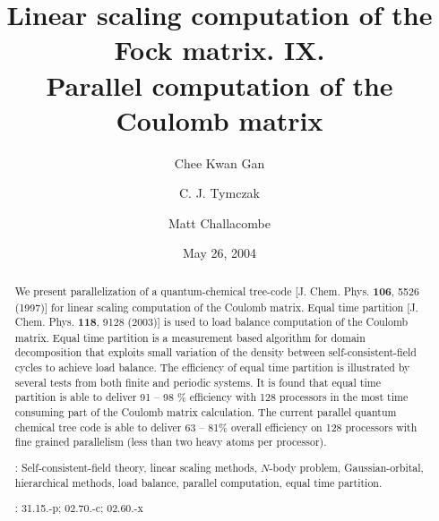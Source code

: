 \commentoutA{\documentclass[prl,aps,twocolumn,twocolumngrid,superbib]{revtex4}}
\begin{document}
\title[Short Title]{
Linear scaling computation of the Fock matrix. IX. \\
Parallel computation of the Coulomb matrix\footnotemark[1]}

\author{Chee Kwan Gan\footnotemark[2]}
\author{C. J. Tymczak}
\author{Matt Challacombe}


\date{May 26, 2004}

\begin{abstract}
We present parallelization of a quantum-chemical tree-code
[J. Chem. Phys. {\bf 106}, 5526 (1997)] for linear scaling computation
of the Coulomb matrix.  Equal time partition [J. Chem. Phys. {\bf
118}, 9128 (2003)] is used to load balance computation of the Coulomb
matrix. Equal time partition is a measurement based algorithm for
domain decomposition that exploits small variation of the density
between self-consistent-field cycles to achieve load balance. The
efficiency of equal time partition is illustrated by several tests
from both finite and periodic systems.  It is found that equal time
partition is able to deliver 91 -- 98 \% efficiency with 128
processors in the most time consuming part of the
Coulomb matrix calculation.  The current parallel quantum chemical
tree code is able to deliver 63 -- 81\% overall efficiency on 128
processors with fine grained parallelism (less than two heavy atoms
per processor).


\smallskip
{}:
Self-consistent-field theory, linear scaling methods, $N$-body problem,
Gaussian-orbital, hierarchical methods, load balance, parallel computation,
equal time partition.

: 
31.15.-p; 02.70.-c; 02.60.-x
\end{abstract}
\maketitle
\end{document}
